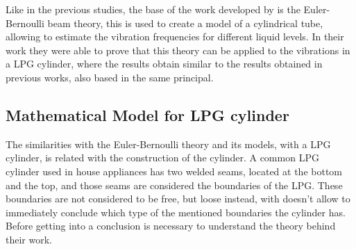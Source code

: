 Like in the previous studies, the base of the work developed by \citeauthor{wuLiquidLevelDetector2014b} is the Euler-Bernoulli beam theory\cite{raoMechanicalVibrations2017,thomsonTheoryVibrationApplications1996}, this is used to create a model of a cylindrical tube, allowing to estimate the vibration frequencies for different liquid levels. In their work they were able to prove that this theory can be applied to the vibrations in a LPG cylinder, where the results obtain similar to the results obtained in previous works, also based in the same principal.

\subsection{Mathematical Model for LPG cylinder}
The similarities with the Euler-Bernoulli theory and its models, with a LPG cylinder, is related with the construction of the cylinder. A common LPG cylinder used in house appliances has two welded seams, located at the bottom and the top, and those seams are considered the boundaries of the LPG. These boundaries are not considered to be free, but loose instead, with doesn't allow to immediately conclude which type of the mentioned boundaries the cylinder has. Before getting into a conclusion is necessary to understand the theory behind their work.

